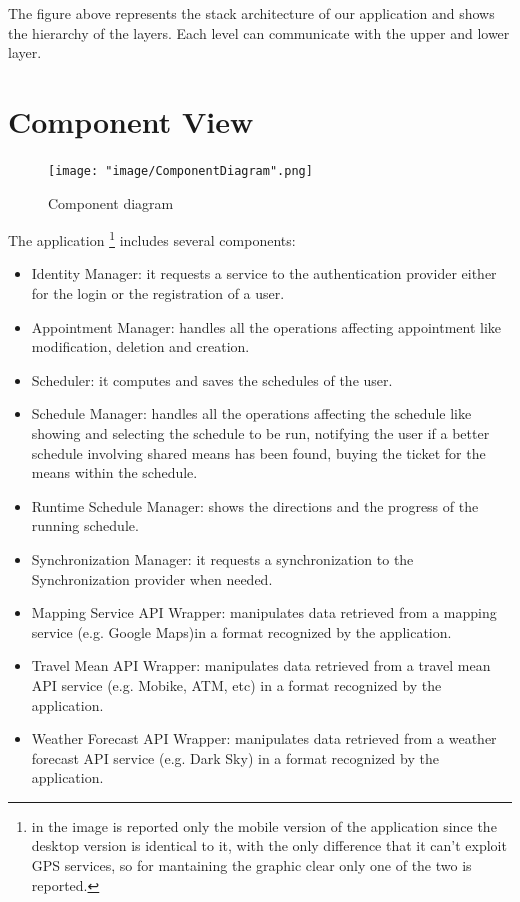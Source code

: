 The figure above represents the stack architecture of our application and shows the hierarchy of the layers. Each level can communicate with the upper and lower layer.

\section{Component View}

\begin{figure}[H]
\begin{center}
\texttt{[image: "image/ComponentDiagram".png]}
\caption{Component diagram}
\end{center}
\end{figure}


The application \footnote{in the image is reported only the mobile version of the application since the desktop version is identical to it, with the only difference that it can't exploit GPS services, so for mantaining the graphic clear only one of the two is reported.}
includes several components: 
\begin{itemize}

\item Identity Manager: it requests a service to the authentication provider either for the login or the registration of a user. 

\item Appointment Manager: handles all the operations affecting appointment like modification, deletion and creation.
 
\item Scheduler: it computes and saves the schedules of the user.

\item Schedule Manager: handles all the operations affecting the schedule like showing and selecting the schedule to be run, notifying the user if a better schedule involving shared means has been found, buying the ticket for the means within the schedule. 

\item Runtime Schedule Manager: shows the directions and the progress of the running schedule.

\item Synchronization Manager: it requests a synchronization to the Synchronization provider when needed.

\item Mapping Service API Wrapper: manipulates data retrieved from a mapping service (e.g. Google Maps)in a format recognized by the application.

\item Travel Mean API Wrapper: manipulates data retrieved from a travel mean API service (e.g. Mobike, ATM, etc) in a format recognized by the application.

\item Weather Forecast API Wrapper: manipulates data retrieved from a weather forecast API service (e.g. Dark Sky) in a format recognized by the application.

\end{itemize}

